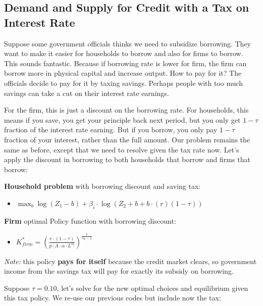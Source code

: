 \documentclass[
]{book}
\providecommand{\tightlist}{%
  \setlength{\itemsep}{0pt}\setlength{\parskip}{0pt}}
\begin{document}
\hypertarget{demand-and-supply-for-credit-with-a-tax-on-interest-rate}{%
\subsection{Demand and Supply for Credit with a Tax on Interest Rate}\label{demand-and-supply-for-credit-with-a-tax-on-interest-rate}}

Suppose some government officials thinks we need to subsidize borrowing.
They want to make it easier for households to borrow and also for firms
to borrow. This sounds fantastic. Because if borrowing rate is lower for
firm, the firm can borrow more in physical capital and increase output.
How to pay for it? The officials decide to pay for it by taxing savings.
Perhaps people with too much savings can take a cut on their interest
rate earnings.

For the firm, this is just a discount on the borrowing rate. For
households, this means if you save, you get your principle back next
period, but you only get \(1-\tau\) fraction of the interest rate earning.
But if you borrow, you only pay \(1-\tau\) fraction of your interest,
rather than the full amount. Our problem remains the same as before,
except that we need to resolve given the tax rate now. Let's apply the
discount in borrowing to both households that borrow and firms that
borrow:

\textbf{Household problem} with borrowing discount and saving tax:

\begin{itemize}
\tightlist
\item
  \(\displaystyle \max_b \log (Z_1 -b)+\beta_i \cdot \log (Z_2 +b+b\cdot (r)(1-\tau ))\)
\end{itemize}

\textbf{Firm} optimal Policy function with borrowing discount:

\begin{itemize}
\tightlist
\item
  \(\displaystyle K_{firm}^* ={\left(\frac{r\cdot (1-\tau )}{p\cdot A\cdot \alpha \cdot L^{\alpha_l } }\right)}^{\frac{1}{\alpha_k -1}}\)
\end{itemize}

\emph{Note:} this policy \textbf{pays for itself} because the credit market
clears, so government income from the savings tax will pay for exactly
its subsidy on borrowing.

Suppose \(\tau =0.10\), let's solve for the new optimal choices and
equilibrium given this tax policy. We re-use our previous codes but
include now the tax:
\end{document}
